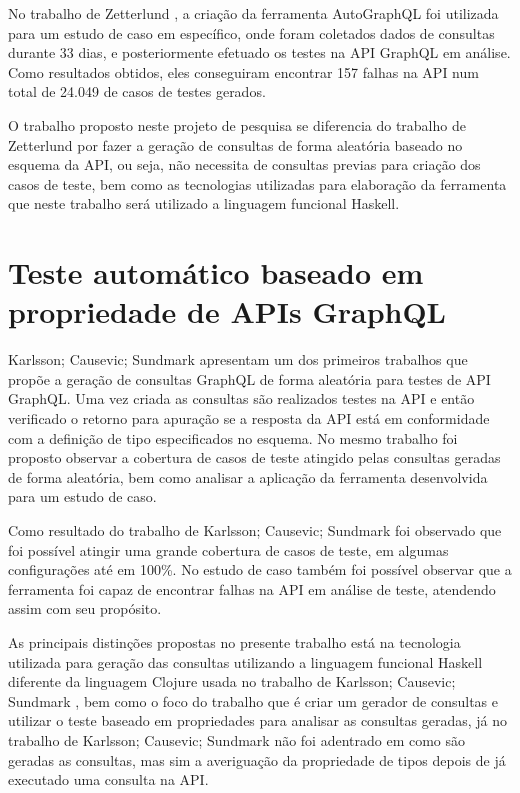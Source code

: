 No trabalho de Zetterlund \cite{zetterlund2021}, a criação da ferramenta AutoGraphQL foi utilizada para um estudo de caso em específico, onde foram coletados dados de consultas durante 33 dias, e posteriormente efetuado os testes na API GraphQL em análise. Como resultados obtidos, eles conseguiram encontrar 157 falhas na API num total de 24.049 de casos de testes gerados.

O trabalho proposto neste projeto de pesquisa se diferencia do trabalho de Zetterlund \cite{zetterlund2021} por fazer a geração de consultas de forma aleatória baseado no esquema da API, ou seja, não necessita de consultas previas para criação dos casos de teste, bem como as tecnologias utilizadas para elaboração da ferramenta que neste trabalho será utilizado a linguagem funcional Haskell.

\section{Teste automático baseado em propriedade de APIs GraphQL}
Karlsson; Causevic; Sundmark \cite{karlsson2020graphql} apresentam um dos primeiros trabalhos que propõe a geração de consultas GraphQL de forma aleatória para testes de API GraphQL. Uma vez criada as consultas são realizados testes na API e então verificado o retorno para apuração se a resposta da API está em conformidade com a definição de tipo especificados no esquema. No mesmo trabalho foi proposto observar a cobertura de casos de teste atingido pelas consultas geradas de forma aleatória, bem como analisar a aplicação da ferramenta desenvolvida para um estudo de caso.

Como resultado do trabalho de Karlsson; Causevic; Sundmark \cite{karlsson2020graphql} foi observado que foi possível atingir uma grande cobertura de casos de teste, em algumas configurações até em 100\%. No estudo de caso também foi possível observar que a ferramenta foi capaz de encontrar falhas na API em análise de teste, atendendo assim com seu propósito.

As principais distinções propostas no presente trabalho está na tecnologia utilizada para geração das consultas utilizando a linguagem funcional Haskell diferente da linguagem Clojure usada no trabalho de Karlsson; Causevic; Sundmark \cite{karlsson2020graphql}, bem como o foco do trabalho que é criar um gerador de consultas e utilizar o teste baseado em propriedades para analisar as consultas geradas, já no trabalho de Karlsson; Causevic; Sundmark \cite{karlsson2020graphql} não foi adentrado em como são geradas as consultas, mas sim a averiguação da propriedade de tipos depois de já executado uma consulta na API.

